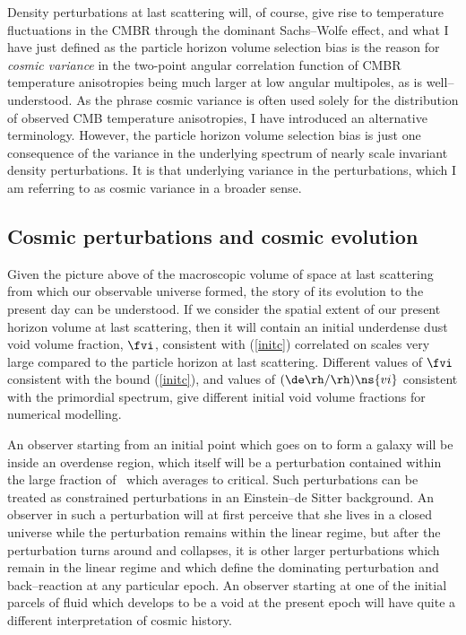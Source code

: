 \documentclass[12pt]{iopart}
\begin{document}
Density perturbations at last scattering will, of course, give rise
to temperature fluctuations in the CMBR through the dominant Sachs--Wolfe
effect, and what I have just defined as the particle horizon volume selection
bias is the reason for {\em cosmic variance} in the two-point angular
correlation function of CMBR temperature anisotropies \cite{LL} being much
larger at low angular multipoles, as is well--understood. As the phrase
cosmic variance is often used solely for the distribution of
observed CMB temperature anisotropies, I have introduced an alternative
terminology. However, the particle horizon volume selection bias is just
one consequence of the variance in the underlying spectrum of nearly
scale invariant density perturbations. It is that underlying variance
in the perturbations, which I am referring to as cosmic variance in a
broader sense.

\subsection{Cosmic perturbations and cosmic evolution\label{structure}}

Given the picture above of the macroscopic volume of space at last scattering
from which our observable universe formed, the story of its evolution to
the present day can be understood. If we consider the spatial extent of
our present horizon volume at last scattering, then it will contain an
initial underdense dust void volume fraction, $\fvi$, consistent with
(\ref{initc}) correlated on scales very large compared to the particle
horizon at last scattering. Different values of $\fvi$ consistent with
the bound (\ref{initc}), and values of $(\de\rh/\rh)\ns{vi}$ consistent
with the primordial spectrum, give different initial void volume fractions
for numerical modelling.

An observer starting from an initial point which goes on to form a galaxy
will be inside an overdense region, which itself will be a perturbation
contained within the large fraction of \SS\ which averages to critical.
Such perturbations can be treated as constrained perturbations in an
Einstein--de Sitter background. An observer in such a perturbation
will at first perceive that she lives in a closed universe while the
perturbation remains within the linear regime, but after the perturbation
turns around and collapses, it is other larger perturbations which remain
in the linear regime and which define the dominating perturbation and
back--reaction at any particular epoch. An observer starting at one of
the initial parcels of fluid which develops to be a void at the present
epoch will have quite a different interpretation of cosmic history.
\end{document}
